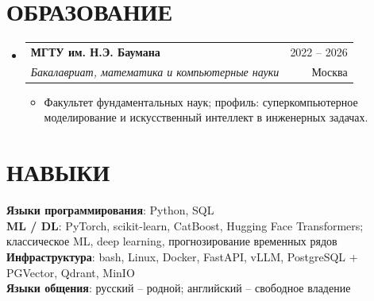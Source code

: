 \documentclass[letterpaper,10pt]{article}
\makeatletter
\newcommand{\resumeItem}[1]{
  \item\small{
    {#1 \vspace{-2pt}}
  }
}
\newcommand{\resumeSubheading}[4]{
  \vspace{-1pt}\item
    \begin{tabular*}{\textwidth}[t]{l@{\extracolsep{\fill}}r}
      \textbf{#1} & {\color{dark-grey}\small #2}\vspace{1pt}\\ %
      \textit{#3} & {\color{dark-grey} \small #4}\\ %
    \end{tabular*}\vspace{-4pt}
}
\newcommand{\resumeSubHeadingListStart}{\begin{itemize}[leftmargin=0in, label={}, itemsep=0pt, topsep=0pt]}
\newcommand{\resumeSubHeadingListEnd}{\end{itemize}}
\newcommand{\resumeItemListStart}{\begin{itemize}[leftmargin=0.18in, itemsep=0pt, topsep=1pt, parsep=0pt, partopsep=0pt]}
\newcommand{\resumeItemListEnd}{\end{itemize}\vspace{-2pt}}
\makeatother
\begin{document}
\section{ОБРАЗОВАНИЕ}
  \resumeSubHeadingListStart
    \resumeSubheading
      {МГТУ им. Н.Э. Баумана}{2022 -- 2026}
      {Бакалавриат, математика и компьютерные науки}{Москва}
      	\resumeItemListStart
    	\resumeItem{Факультет фундаментальных наук; профиль: суперкомпьютерное моделирование и искусственный интеллект в инженерных задачах.}
        \resumeItemListEnd
  \resumeSubHeadingListEnd


%
\section{НАВЫКИ}
 \begin{itemize}[leftmargin=0in, label={}]
    \small{\item{
     \textbf{Языки программирования}{: Python, SQL}\vspace{2pt} \\
     \textbf{ML / DL}{: PyTorch, scikit-learn, CatBoost, Hugging Face Transformers; классическое ML, deep learning, прогнозирование временных рядов}\vspace{2pt} \\
     \textbf{Инфраструктура}{: bash, Linux, Docker, FastAPI, vLLM, PostgreSQL + PGVector, Qdrant, MinIO}\vspace{2pt} \\
     \textbf{Языки общения}{: русский -- родной; английский -- свободное владение}
    }}
 \end{itemize}


\end{document}
